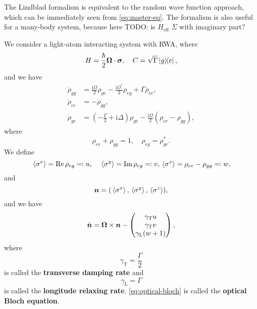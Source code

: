 \documentclass[hyperref, a4paper]{article}
\newcommand*{\ii}{\mathrm{i}}
\newcommand*{\concept}[1]{{\textbf{#1}}}
\begin{document}
The Lindblad formalism is equivalent to the random wave function approach,
which can be immediately seen from \eqref{eq:master-eq}.
The formalism is also useful for a many-body system, 
because here TODO: is $H_{\text{eff}}$ $\Sigma$ with imaginary part?

We consider a light-atom interacting system with RWA, where 
\begin{equation}
    H = \frac{\hbar}{2} \vb*{\Omega} \cdot \vb*{\sigma}, \quad C = \sqrt{\Gamma} \dyad{g}{e},
\end{equation} 
and we have 
\begin{equation}
    \begin{aligned}
        \dot{\rho}_{gg} &= \frac{\ii \Omega}{2} \rho_{ge} - \frac{\ii \Omega^*}{2} \rho_{eg} + \Gamma \rho_{ee}, \\
        \dot{\rho}_{ee} &= - \dot{\rho}_{gg}, \\
        \dot{\rho}_{ge} &= \left( - \frac{\Gamma}{2} + \ii \Delta \right) \rho_{ge} - \frac{\ii \Omega}{2} (\rho_{ee} - \rho_{gg}),
    \end{aligned}
\end{equation}
where 
\begin{equation}
    \rho_{ee} + \rho_{gg} = 1, \quad \rho_{eg} = \rho_{ge}^*.
\end{equation}
We define 
\begin{equation}
    \expval*{\sigma^x} = \Re \rho_{eg} \eqqcolon u, \quad \expval*{\sigma^y} = \Im \rho_{eg} \eqqcolon v,
    \expval*{\sigma^z} = \rho_{ee} - \rho_{gg} \eqqcolon w,
\end{equation}
and 
\begin{equation}
    \vb*{n} = (\expval*{\sigma^x}, \expval*{\sigma^y}, \expval*{\sigma^z}),
\end{equation}
and we have 
\begin{equation}
    \dot{\vb*{n}} = \vb*{\Omega} \times \vb*{n} - \pmqty{ \gamma_\text{T} u \\ \gamma_\text{T} v \\ \gamma_\text{L} (w+1) },
    \label{eq:optical-bloch}
\end{equation}
where 
\begin{equation}
    \gamma_\text{T} = \frac{\Gamma}{2}
\end{equation}
is called the \concept{transverse damping rate} and 
\begin{equation}
    \gamma_\text{L} = \Gamma
\end{equation}
is called the \concept{longitude relaxing rate}. \eqref{eq:optical-bloch} is called the 
\concept{optical Bloch equation}.
\end{document}
